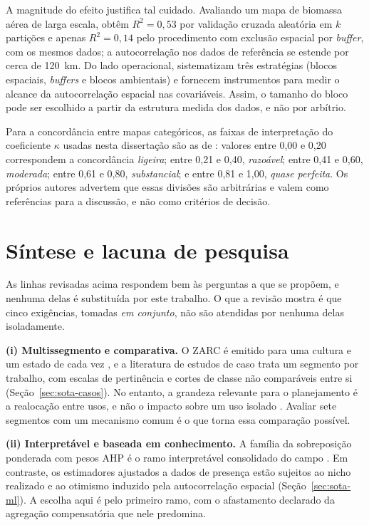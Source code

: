 A magnitude do efeito justifica tal cuidado. Avaliando um mapa de biomassa aérea de larga escala,
\citet[pp.~2, 4--5]{ploton_spatial_2020} obtêm $R^2 = 0{,}53$ por validação cruzada aleatória em $k$
partições e apenas $R^2 = 0{,}14$ pelo procedimento com exclusão espacial por \emph{buffer}, com os
mesmos dados; a autocorrelação nos dados de referência se estende por cerca de 120~km. Do lado
operacional, \citet[p.~225]{valavi_blockcv_2019} sistematizam três estratégias (blocos espaciais,
\emph{buffers} e blocos ambientais) e fornecem instrumentos para medir o alcance da autocorrelação
espacial nas covariáveis. Assim, o tamanho do bloco pode ser escolhido a partir da estrutura medida
dos dados, e não por arbítrio.

Para a concordância entre mapas categóricos, as faixas de interpretação do coeficiente $\kappa$ usadas
nesta dissertação são as de \citet[p.~165]{landis_measurement_1977}: valores entre 0,00 e 0,20
correspondem a concordância \emph{ligeira}; entre 0,21 e 0,40, \emph{razoável}; entre 0,41 e 0,60,
\emph{moderada}; entre 0,61 e 0,80, \emph{substancial}; e entre 0,81 e 1,00, \emph{quase perfeita}.
Os próprios autores advertem que essas divisões são arbitrárias e valem como referências para a
discussão, e não como critérios de decisão.

\section{Síntese e lacuna de pesquisa}\label{sec:sota-lacuna}

As linhas revisadas acima respondem bem às perguntas a que se propõem, e nenhuma delas é substituída por
este trabalho. O que a revisão mostra é que cinco exigências, tomadas \emph{em conjunto}, não são
atendidas por nenhuma delas isoladamente.

\textbf{(i) Multissegmento e comparativa.} O ZARC é emitido para uma cultura e um estado de cada vez
\citep[ementa]{mapa_port_2026}, e a literatura de estudos de caso trata um segmento por trabalho,
com escalas de pertinência e cortes de classe não comparáveis entre si (Seção~\ref{sec:sota-casos}).
No entanto, a grandeza relevante para o planejamento é a realocação entre usos, e não o impacto sobre um
uso isolado \citep[p.~1]{rising_crop_2020}. Avaliar sete segmentos com um mecanismo comum é o que
torna essa comparação possível.

\textbf{(ii) Interpretável e baseada em conhecimento.} A família da sobreposição ponderada com pesos
AHP é o ramo interpretável consolidado do campo \citep[Tabela~4, p.~710]{malczewski_gisbased_2006}.
Em contraste, os estimadores ajustados a dados de presença estão sujeitos ao nicho realizado e ao
otimismo induzido pela autocorrelação espacial (Seção~\ref{sec:sota-ml}). A escolha aqui é pelo primeiro
ramo, com o afastamento declarado da agregação compensatória que nele predomina.

